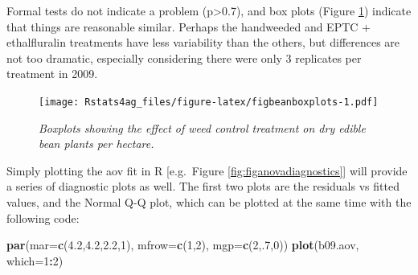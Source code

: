 \documentclass[letterpaper,]{book}
\newenvironment{Shaded}{\begin{snugshade}}{\end{snugshade}}
\newcommand{\DataTypeTok}[1]{\textcolor[rgb]{0.13,0.29,0.53}{#1}}
\newcommand{\DecValTok}[1]{\textcolor[rgb]{0.00,0.00,0.81}{#1}}
\newcommand{\FloatTok}[1]{\textcolor[rgb]{0.00,0.00,0.81}{#1}}
\newcommand{\KeywordTok}[1]{\textcolor[rgb]{0.13,0.29,0.53}{\textbf{#1}}}
\newcommand{\NormalTok}[1]{#1}
\newcommand{\OperatorTok}[1]{\textcolor[rgb]{0.81,0.36,0.00}{\textbf{#1}}}
\newcommand{\StringTok}[1]{\textcolor[rgb]{0.31,0.60,0.02}{#1}}
\begin{document}
Formal tests do not indicate a problem (p\textgreater{}0.7), and box plots (Figure \ref{fig:figbeanboxplots}) indicate that things are reasonable similar. Perhaps the handweeded and EPTC + ethalfluralin treatments have less variability than the others, but differences are not too dramatic, especially considering there were only 3 replicates per treatment in 2009.



\begin{Shaded}
\end{Shaded}

\begin{figure}
\centering
\texttt{[image: Rstats4ag\_files/figure-latex/figbeanboxplots-1.pdf]}
\caption{\label{fig:figbeanboxplots}\emph{Boxplots showing the effect of weed control treatment on dry edible bean plants per hectare.}}
\end{figure}

Simply plotting the aov fit in R {[}e.g.~Figure \ref{fig:figanovadiagnostics}{]} will provide a series of diagnostic plots as well. The first two plots are the residuals vs fitted values, and the Normal Q-Q plot, which can be plotted at the same time with the following code:



\begin{Shaded}
\begin{Highlighting}[]
\KeywordTok{par}\NormalTok{(}\DataTypeTok{mar=}\KeywordTok{c}\NormalTok{(}\FloatTok{4.2}\NormalTok{,}\FloatTok{4.2}\NormalTok{,}\FloatTok{2.2}\NormalTok{,}\DecValTok{1}\NormalTok{), }\DataTypeTok{mfrow=}\KeywordTok{c}\NormalTok{(}\DecValTok{1}\NormalTok{,}\DecValTok{2}\NormalTok{), }\DataTypeTok{mgp=}\KeywordTok{c}\NormalTok{(}\DecValTok{2}\NormalTok{,.}\DecValTok{7}\NormalTok{,}\DecValTok{0}\NormalTok{))}
\KeywordTok{plot}\NormalTok{(b09.aov, }\DataTypeTok{which=}\DecValTok{1}\OperatorTok{:}\DecValTok{2}\NormalTok{)}
\end{Highlighting}
\end{Shaded}
\end{document}
